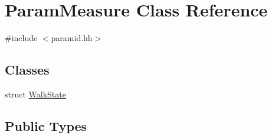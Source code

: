 \hypertarget{class_param_measure}{}\section{Param\+Measure Class Reference}
\label{class_param_measure}


{\ttfamily \#include $<$paramid.\+hh$>$}

\subsection*{Classes}
\begin{DoxyCompactItemize}
\item 
struct \mbox{\hyperlink{struct_param_measure_1_1_walk_state}{Walk\+State}}
\end{DoxyCompactItemize}
\subsection*{Public Types}
